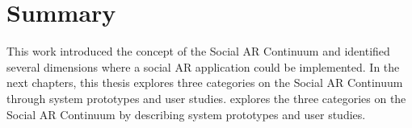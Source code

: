 


\section{Summary}

This work introduced the concept of the Social AR Continuum and identified several dimensions where a social AR application could be implemented.
In the next chapters, 
this thesis explores three categories on the Social AR Continuum through system prototypes and user studies.
explores the three categories on the Social AR Continuum by describing system prototypes and user studies. 

